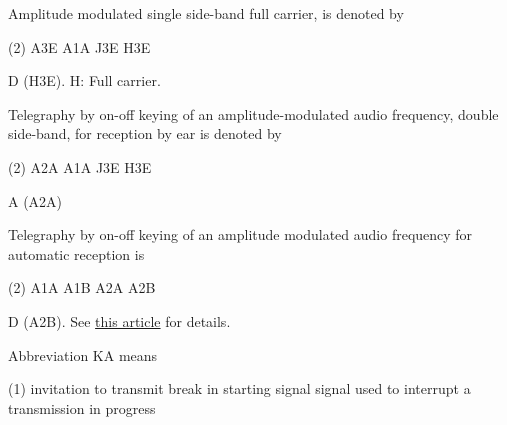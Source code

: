 \documentclass[a4paper]{article}
\begin{document}
\vspace{5mm}



\begin{question}Amplitude modulated single side-band full carrier, is denoted by
	\begin{tasks}(2)
		\task A3E
		\task A1A
		\task J3E
		\task H3E
	\end{tasks}
\end{question}

\begin{solution}
	D (H3E). H: Full carrier.
\end{solution}

\vspace{5mm}



\begin{question}Telegraphy by on-off keying of an amplitude-modulated audio frequency, double side-band, for reception by ear is denoted by
	\begin{tasks}(2)
		\task A2A
		\task A1A
		\task J3E
		\task H3E
	\end{tasks}
\end{question}

\begin{solution}
	A (A2A)
\end{solution}

\vspace{5mm}



\begin{question}Telegraphy by on-off keying of an amplitude modulated audio frequency for automatic reception is \spaces
	\begin{tasks}(2)
		\task A1A
		\task A1B
		\task A2A
		\task A2B
	\end{tasks}
\end{question}

\begin{solution}
	D (A2B). See \href{https://www.qsl.net/lz1iii/html/Modulation\%20Codes.html}{this article} for details.
\end{solution}

\vspace{5mm}



\begin{question}Abbreviation \apostrophe{}KA\apostrophe{} means \spaces
	\begin{tasks}(1)
		\task invitation to transmit
		\task break in
		\task starting signal
		\task signal used to interrupt a transmission in progress
	\end{tasks}
\end{question}
\end{document}
